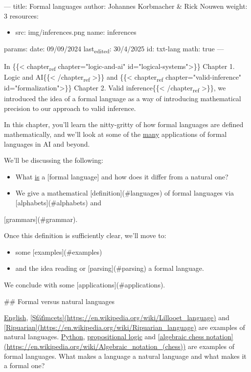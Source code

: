 \documentclass[11pt]{article}
\author{rnouwen}
\date{\today}
\title{}
\begin{document}
\tableofcontents

---
title: Formal languages
author: Johannes Korbmacher \& Rick Nouwen
weight: 3
resources:
\begin{itemize}
\item src: img/inferences.png
name: inferences
\end{itemize}
params: 
  date: 09/09/2024
  last\textsubscript{edited}: 30/4/2025
  id: txt-lang
  math: true
---

In \{\{< chapter\textsubscript{ref} chapter="logic-and-ai" id="logical-systems">\}\}
Chapter 1. Logic and AI\{\{< /chapter\textsubscript{ref} >\}\} and \{\{< chapter\textsubscript{ref}
chapter="valid-inference" id="formalization">\}\}
Chapter 2. Valid inference\{\{< /chapter\textsubscript{ref} >\}\}, we introduced the idea of a formal language as a way of introducing mathematical precision to our approach to valid inference.

In this chapter, you'll learn the nitty-gritty of how formal languages are
defined mathematically, and we'll look at some of the \uline{many} applications of
formal languages in AI and beyond. 

We'll be discussing the following:

\begin{itemize}
\item What \uline{is} a [formal language] and how does it differ from a natural one?

\item We give a mathematical [definition](\#languages) of formal languages via [alphabets](\#alphabets) and
\end{itemize}
[grammars](\#grammar).

Once this definition is sufficiently clear, we'll move to:

\begin{itemize}
\item some [examples](\#examples)
\item and the idea reading or [parsing](\#parsing) a formal language.
\end{itemize}

We conclude with some [applications](\#applications).

\#\# Formal versus natural languages

\uline{English}, \uline{[St̓át̓imcets](\url{https://en.wikipedia.org/wiki/Lillooet\_language})} and \uline{[Ripuarian](\url{https://en.wikipedia.org/wiki/Ripuarian\_language})} are examples of natural languages. \uline{Python}, \uline{propositional logic} and \uline{[algebraic chess notation](\url{https://en.wikipedia.org/wiki/Algebraic\_notation\_(chess)})} are examples of formal languages. What makes a language a natural language and what makes it a formal one?
\end{document}
